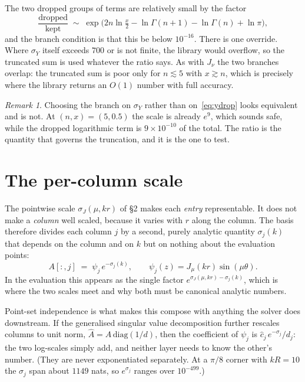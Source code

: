\documentclass[11pt]{article}
\theoremstyle{remark}
\newtheorem{remark}{Remark}
\begin{document}
The two dropped groups of terms are relatively small by the factor
\begin{equation}
  \frac{\text{dropped}}{\text{kept}} \;\sim\;
  \exp\!\Big(2n\ln\tfrac{x}{2}-\ln\Gamma(n+1)-\ln\Gamma(n)+\ln\pi\Big),
  \label{eq:ydrop}
\end{equation}
and the branch condition is that this be below $10^{-16}$. There is one override. Where
$\sigma_Y$ itself exceeds $700$ or is not finite, the library would overflow, so the
truncated sum is used whatever the ratio says. As with $J_\nu$ the two
branches overlap: the truncated sum is poor only for $n\lesssim5$ with $x\gtrsim n$, which is
precisely where the library returns an $O(1)$ number with full accuracy.

\begin{remark}
Choosing the branch on $\sigma_Y$ rather than on~\eqref{eq:ydrop} looks equivalent and is not.
At $(n,x)=(5,0.5)$ the scale is already $e^{9}$, which sounds safe, while the dropped
logarithmic term is $9\times10^{-10}$ of the total. The ratio is the quantity that governs
the truncation, and it is the one to test.
\end{remark}

\section{The per-column scale}
\label{sec:column}

The pointwise scale $\sigma_J(\mu,kr)$ of \S2 makes each \emph{entry} representable. It does
not make a \emph{column} well scaled, because it varies with $r$ along the column. The basis
therefore divides each column $j$ by a second, purely analytic quantity $\sigma_j(k)$ that
depends on the column and on $k$ but on nothing about the evaluation points:
\[
  A[:,j] \;=\; \psi_j\,e^{-\sigma_j(k)},
  \qquad
  \psi_j(z)=J_\mu(k r)\sin(\mu\theta).
\]
In the evaluation this appears as the single factor $e^{\sigma_J(\mu,kr)-\sigma_j(k)}$, which
is where the two scales meet and why both must be canonical analytic numbers.

Point-set independence is what makes this compose with anything the solver does downstream.
If the generalised singular value decomposition further rescales columns to unit norm,
$\hat A = A\,\mathrm{diag}(1/d)$, then the coefficient of $\psi_j$ is
$\hat c_j\,e^{-\sigma_j}/d_j$: the two log-scales simply add, and neither layer needs to know
the other's number. (They are never exponentiated separately. At a $\pi/8$ corner with
$kR=10$ the $\sigma_j$ span about $1149$ nats, so $e^{\sigma_j}$ ranges over $10^{-499}$.)
\end{document}
